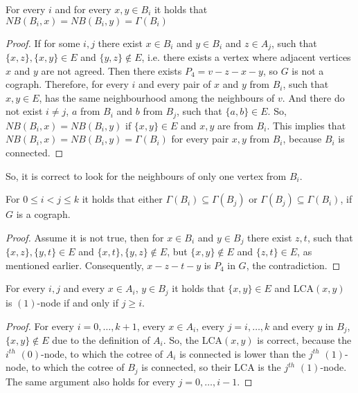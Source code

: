 \begin{theorem}
    For every $i$ and for every $x, y \in B_i$ it holds that $NB(B_i,x) = NB(B_i,y) = \Gamma{(B_i)}$
\end{theorem}
\begin{proof}
    If for some $i, j$ there exist $x \in B_i$ and $y \in B_i$ and $z \in A_j$, such that $\{x, z\}, \{x, y\} \in E$ and $\{y, z\} \notin E$, i.e. there exists a vertex where adjacent vertices $x$ and $y$ are not agreed. Then there exists $P_4 = v-z-x-y$, so $G$ is not a cograph. Therefore, for every $i$ and every pair of $x$ and $y$ from $B_i$, such that ${x,y} \in E$, has the same neighbourhood among the neighbours of $v$. And there do not exist $i \neq j$, $a$ from $B_i$ and $b$ from $B_j$, such that $\{a,b\} \in E$. So, $NB(B_i,x) = NB(B_i,y)$ if $\{x,y\} \in E$ and $x,y$ are from $B_i$. This implies that $NB(B_i,x) = NB(B_i,y) = \Gamma{(B_i)}$ for every pair $x,y$ from $B_i$, because $B_i$ is connected. 
\end{proof}
So, it is correct to look for the neighbours of only one vertex from $B_i$.

\begin{theorem}
    For $0 \leq i < j \leq k$ it holds that either $\Gamma{(B_i)} \subseteq \Gamma{(B_j)}$ or $\Gamma{(B_j)} \subseteq \Gamma{(B_i)}$, if $G$ is a cograph.
\end{theorem}
\begin{proof}
Assume it is not true, then for $x \in B_i$ and $y \in B_j$ there exist $z, t$, such that $\{x,z\},\{y,t\} \in E$ and $\{x,t\}, \{y,z\} \notin E$, but $\{x,y\} \notin E$ and $\{z,t\} \in E$, as mentioned earlier. Consequently, $x-z-t-y$ is $P_4$ in $G$, the contradiction.
\end{proof}

\begin{theorem}
\label{different_labels_subtree}
    For every $i,j$ and every $x \in A_i$, $y \in B_j$ it holds that $\{x,y\} \in E$ and LCA$(x,y)$ is $(1)$-node if and only if $j \geq i$.
\end{theorem}
\begin{proof}
    For every $i=0,\ldots,k+1$, every $x \in A_i$, every $j=i,\ldots,k$ and every $y$ in $B_j$, $\{x,y\} \notin E$ due to the definition of $A_i$. So, the LCA$(x,y)$ is correct, because the $i^{th}$ $(0)$-node, to which the cotree of $A_i$ is connected is lower than the $j^{th}$ $(1)$-node, to which the cotree of $B_j$ is connected, so their LCA is the $j^{th}$ $(1)$-node. The same argument also holds for every $j=0,\ldots,i-1$.
\end{proof}
